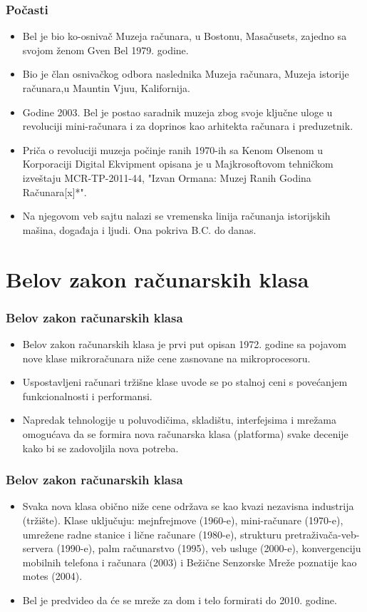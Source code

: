 \documentclass{beamer}
\begin{document}
\begin{frame}[fragile]\frametitle{Počasti}
	\begin{itemize}	
		\item Bel je bio ko-osnivač Muzeja računara, u Bostonu, Masačusets, zajedno sa svojom ženom Gven Bel 1979. godine. 
		\item Bio je član osnivačkog odbora naslednika Muzeja računara, Muzeja istorije računara,u Mauntin Vjuu, Kalifornija.
		\item Godine 2003. Bel je postao saradnik muzeja zbog svoje ključne uloge u revoluciji mini-računara i za doprinos kao arhitekta računara i preduzetnik.
		\item Priča o revoluciji muzeja počinje ranih 1970-ih sa Kenom Olsenom u Korporaciji Digital Ekvipment opisana je u Majkrosoftovom tehničkom izveštaju MCR-TP-2011-44, "Izvan Ormana: Muzej Ranih Godina Računara[x]*".
		\item Na njegovom veb sajtu nalazi se vremenska linija računanja istorijskih mašina, događaja i ljudi. Ona pokriva B.C. do danas.
	\end{itemize}
\end{frame}

\section{Belov zakon računarskih klasa}

\begin{frame}[fragile]\frametitle{Belov zakon računarskih klasa}
		\begin{itemize}		
			\item Belov zakon računarskih klasa je prvi put opisan 1972. godine sa pojavom nove klase mikroračunara niže cene zasnovane na mikroprocesoru. 
			\item Uspostavljeni računari tržišne klase uvode se po stalnoj ceni s povećanjem funkcionalnosti i performansi.
			\item Napredak tehnologije u poluvodičima, skladištu, interfejsima i mrežama omogućava da se formira nova računarska klasa (platforma) svake decenije kako bi se zadovoljila nova potreba.
			
	\end{itemize}
\end{frame}

\begin{frame}[fragile]\frametitle{Belov zakon računarskih klasa}
	\begin{itemize}		
		\item Svaka nova klasa obično niže cene održava se kao kvazi nezavisna industrija (tržište). Klase uključuju: mejnfrejmove (1960-e), mini-računare (1970-e), umrežene radne stanice i lične računare (1980-e), strukturu pretraživača-veb-servera (1990-e), palm računarstvo (1995), veb usluge (2000-e), konvergenciju mobilnih telefona i računara (2003) i Bežične Senzorske Mreže poznatije kao motes (2004).
	   \item Bel je predvideo da će se mreže za dom i telo formirati do 2010. godine.		
	\end{itemize}
\end{frame}
\end{document}
